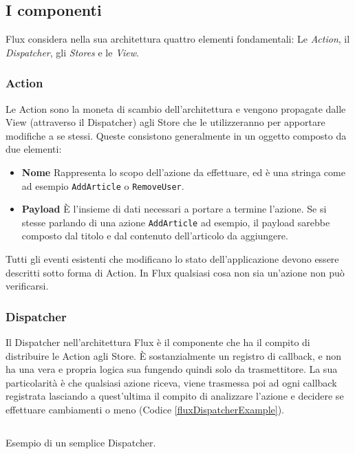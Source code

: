 \subsection{I componenti}
\label{FluxComponents}
Flux considera nella sua architettura quattro elementi fondamentali: Le \textit{Action}, il \textit{Dispatcher}, gli \textit{Stores} e le \textit{View}.

\subsubsection*{Action}
Le Action sono la moneta di scambio dell'architettura e vengono propagate dalle View (attraverso il Dispatcher) agli Store che le utilizzeranno per apportare modifiche a se stessi. Queste consistono generalmente in un oggetto composto da due elementi:

    \begin{itemize}
        \item \textbf{Nome} Rappresenta lo scopo dell'azione da effettuare, ed è una stringa come ad esempio \texttt{AddArticle} o \texttt{RemoveUser}. 
        \item \textbf{Payload} È l'insieme di dati necessari a portare a termine l'azione. Se si stesse parlando di una azione \texttt{AddArticle} ad esempio, il payload sarebbe composto dal titolo e dal contenuto dell'articolo da aggiungere.
    \end{itemize}

Tutti gli eventi esistenti che modificano lo stato dell'applicazione devono essere descritti sotto forma di Action. In Flux qualsiasi cosa non sia un'azione non può verificarsi.

\subsubsection*{Dispatcher}
Il Dispatcher nell'architettura Flux è il componente che ha il compito di distribuire le Action agli Store. È sostanzialmente un registro di callback, e non ha una vera e propria logica sua fungendo quindi solo da trasmettitore. La sua particolarità è che qualsiasi azione riceva, viene trasmessa poi ad ogni callback registrata lasciando a quest'ultima il compito di analizzare l'azione e decidere se effettuare cambiamenti o meno (Codice \ref{fluxDispatcherExample}).

\begin{listing}[ht]
\inputminted{javascript}{sources/fluxDispatcherExample.js}
\caption{Esempio di un semplice Dispatcher.} 
\label{fluxDispatcherExample} 
\end{listing} 

